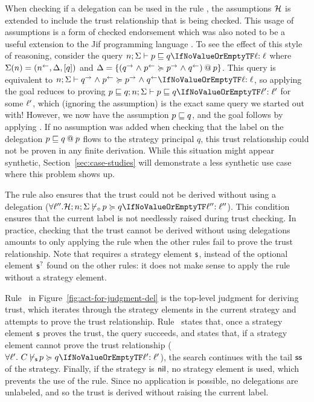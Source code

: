 When checking if a delegation can be used in the rule , the assumptions $\Assumps$ is extended to include the trust relationship that is being checked. This usage of assumptions is a form of checked endorsement which was also noted to be a useful extension to the Jif programming language \cite{Chong:2007:SWA:1294261.1294265}.
To see the effect of this style of reasoning, consider the query $\flowstoquery{n; \env}{p}{q}{\level}$ where $\env(n) = (\integ{n}, \scope, \lbrack q \rbrack)$ and $\scope = \{\lb{p}{(\conf{q} \conj \integ{p} \actsfor \conf{p} \conj \integ{q})} \}$. This query is equivalent to $\actsforquery{n; \env}{\conf{q} \conj \integ{p}}{\conf{p} \conj \integ{q}}{\level}$, so applying  the goal reduces to proving $\flowstoquery{p \flowsto q; n; \env}{p}{q}{\level'}$ for some $\level'$, which (ignoring the assumption) is the exact same query we started out with! However, we now have the assumption $p \flowsto q$, and the goal follows by applying . If no assumption was added when checking that the label on the delegation $\lb{p}{p \flowsto q}$ flows to the strategy principal $q$, this trust relationship could not be proven in any finite derivation. While this situation might appear synthetic, Section~\ref{sec:case-studies} will demonstrate a less synthetic use case where this problem shows up.

The rule also ensures that the trust could not be derived without using a delegation ($\forall \level''. \notactsforquery{\Assumps; n; \env}[\!\!\none]{\,p}{q}{\level''}$). This condition ensures that the current label is not needlessly raised during trust checking. In practice, checking that the trust cannot be derived without using delegations amounts to only applying the  rule when the other rules fail to prove the trust relationship. Note that  requires a strategy element $\stratelem$, instead of the optional element $\option{\stratelem}$ found on the other rules: it does not make sense to apply the  rule without a strategy element.

Rule~ in Figure~\ref{fig:act-for-judgment-del} is the top-level judgment for deriving trust, which iterates through the strategy elements in the current strategy and attempts to prove the trust relationship. Rule~ states that, once a strategy element $\stratelem$ proves the trust, the query succeeds, and  states that, if a strategy element cannot prove the trust relationship ($\forall \level'.~ \notactsforquery{C}[\!\!\stratelem]{\,p}{q}{\level'}$), the search continues with the tail $\stratelem*$ of the strategy. Finally, if the strategy is $\nil$, no strategy element is used, which prevents the use of the  rule. Since no application  is possible, no delegations are unlabeled, and so the trust is derived without raising the current label.

